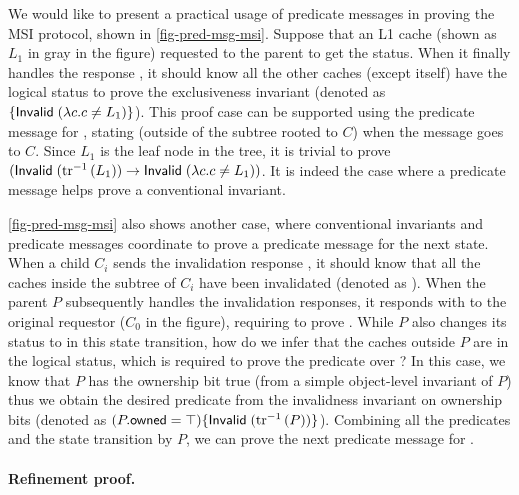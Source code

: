 \documentclass[sigplan,10pt,review,anonymous,screen]{acmart}\settopmatter{printfolios=true,printccs=false,printacmref=false}
\begin{document}
We would like to present a practical usage of predicate messages in proving the MSI protocol, shown in \autoref{fig-pred-msg-msi}.
Suppose that an L1 cache (shown as {\color{mygray} $L_1$} in gray in the figure) requested to the parent to get the \stM{} status.
When it finally handles the response , it should know all the other caches (except itself) have the logical \stI{} status to prove the exclusiveness invariant (denoted as {\color{mygray} $\{\textsf{Invalid}\;(\lambda c. c \neq L_1)\}$}).
This proof case can be supported using the predicate message for , stating  (outside of the subtree rooted to $C$) when the message goes to $C$.
Since $L_1$ is the leaf node in the tree, it is trivial to prove $(\textsf{Invalid}\;(\textrm{tr}^{-1}\,(L_1)) \to \textsf{Invalid}\;(\lambda c. c \neq L_1))$.
It is indeed the case where a predicate message helps prove a conventional invariant.

\autoref{fig-pred-msg-msi} also shows another case, where conventional invariants and predicate messages coordinate to prove a predicate message for the next state.
When a child $C_i$ sends the invalidation response , it should know that all the caches inside the subtree of $C_i$ have been invalidated (denoted as {\color{myblue} }).
When the parent $P$ subsequently handles the invalidation responses, it responds with  to the original requestor ($C_0$ in the figure), requiring to prove {\color{myred} }.
While $P$ also changes its status to \stI{} in this state transition, how do we infer that the caches outside $P$ are in the logical \stI{} status, which is required to prove the predicate over {\color{myred} }?
In this case, we know that $P$ has the ownership bit true (from a simple object-level invariant of $P$) thus we obtain the desired predicate from the invalidness invariant on ownership bits (denoted as {\color{myblue} $(P.\textsf{owned} = \top)\{\textsf{Invalid}\;(\textrm{tr}^{-1}\,(P))\}$}).
Combining all the predicates and the state transition by $P$, we can prove the next predicate message for {\color{myred} }.

\paragraph{Refinement proof.}

\newcommand{\implcoh}[3]{\ensuremath{\textit{Coh}\,(#1, #2, #3)}}
\newcommand{\speccoh}[1]{\ensuremath{\textit{Spec}\,(v)}}
\end{document}
